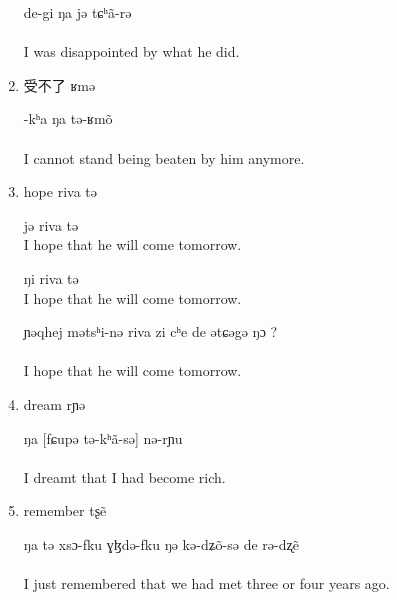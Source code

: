 \documentclass[oldfontcommands,oneside,a4paper,11pt]{article}
\newcommand{\ipa}[1]{{\phon #1}} %
\begin{document}
\begin{enumerate}
\begin{exe}
\ex
\gll [tu  liska nə-və-sə] de-gi   ŋa jə tɕʰã-rə \\
\\
\glt  I was disappointed by what he did.
\end{exe}

\item 受不了 \ipa{ʁmə}

\begin{exe}
\ex
{}-kʰa   ŋa tə-ʁmõ \\
\\
\glt  I cannot stand being beaten by him anymore.
\end{exe}


 \item hope \ipa{riva tə}
 
 \begin{exe}
\ex
{} jə riva tə
\\
\glt  I hope that he will come tomorrow.
\end{exe}

 
 \begin{exe}
\ex
{} ŋi riva tə
\\
\glt  I hope that he will come tomorrow.
\end{exe}

 \begin{exe}
\ex
\gll  ɲəqhej mətsʰi-nə riva zi cʰe de ətɕəgə ŋɔ ?\\
\\
\glt  I hope that he will come tomorrow.
\end{exe}

\item dream \ipa{rɲə}


\begin{exe}
\ex
\gll ŋa [fɕupə tə-kʰã-sə] nə-rɲu \\
\\
\glt  I dreamt that I had become rich.
\end{exe}

\item remember \ipa{tʂẽ}
\begin{exe}
\ex
\gll ŋa tə xsɔ-fku  ɣɮdə-fku ŋə kə-dʑõ-sə de rə-dʐẽ \\
\\
\glt  I just remembered that we had met three or four years ago.
\end{exe}


\end{enumerate}
\end{document}
